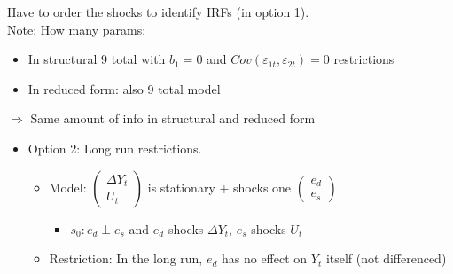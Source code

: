 Have to order the shocks to identify IRFs (in option 1). \\

Note: How many params: 
\begin{itemize}
    \item In structural 9 total with $b_1=0$ and $Cov(\varepsilon_{1t}, \varepsilon_{2t})=0$ restrictions
    \item In reduced form: also 9 total model
\end{itemize}
$\Rightarrow$ Same amount of info in structural and reduced form 

\begin{itemize}
    \item Option 2: Long run restrictions. 
    \begin{itemize}
        \item Model: $\begin{pmatrix}
            \Delta Y_t \\
            U_t
        \end{pmatrix}$ is stationary + shocks one $\begin{pmatrix}
            e_d \\
            e_s
        \end{pmatrix}$
        \begin{itemize}
            \item $s_0: e_d \perp e_s$ and $e_d$ shocks $\Delta Y_t$, $e_s$ shocks $U_t$
        \end{itemize}
        \item Restriction: In the long run, $e_d$ has no effect on $Y_t$ itself (not differenced) 
    \end{itemize}
\end{itemize}

